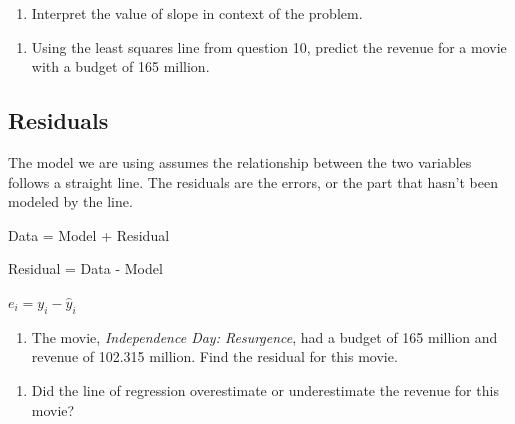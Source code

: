 \documentclass[
]{report}
\providecommand{\tightlist}{%
  \setlength{\itemsep}{0pt}\setlength{\parskip}{0pt}}
\begin{document}
\vspace{.8in}

\begin{enumerate}
\def\labelenumi{\arabic{enumi}.}
\setcounter{enumi}{10}
\tightlist
\item
  Interpret the value of slope in context of the problem.
\end{enumerate}

\vspace{1in}

\begin{enumerate}
\def\labelenumi{\arabic{enumi}.}
\setcounter{enumi}{11}
\tightlist
\item
  Using the least squares line from question 10, predict the revenue for a movie with a budget of 165 million.
\end{enumerate}

\vspace{.8in}

\hypertarget{residuals}{%
\subsection{Residuals}\label{residuals}}

The model we are using assumes the relationship between the two variables follows a straight line. The residuals are the errors, or the part that hasn't been modeled by the line.

\begin{center}
Data = Model + Residual

Residual = Data - Model

$e_i=y_i-\hat{y}_i$
\end{center}

\begin{enumerate}
\def\labelenumi{\arabic{enumi}.}
\setcounter{enumi}{12}
\tightlist
\item
  The movie, \emph{Independence Day: Resurgence}, had a budget of 165 million and revenue of 102.315 million. Find the residual for this movie.
\end{enumerate}

\vspace{.8in}

\begin{enumerate}
\def\labelenumi{\arabic{enumi}.}
\setcounter{enumi}{13}
\tightlist
\item
  Did the line of regression overestimate or underestimate the revenue for this movie?
\end{enumerate}
\end{document}
